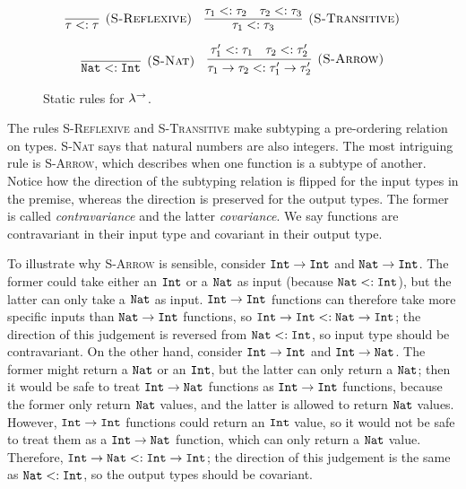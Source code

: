 \begin{figure}[h]

\fbox{$\tau <: \tau$}

	
\[
\begin{array}{c}

\infer[\textsc{(S-Reflexive)}]
	{\tau <: \tau}
	{}
	~~~
\infer[\textsc{(S-Transitive)}]
	{\tau_1 <: \tau_3}
	{\tau_1 <: \tau_2 & \tau_2 <: \tau_3}\\[2ex]

\infer[\textsc{(S-Nat)}]
	{\Nat <: \Int}
	{}~~~

\infer[\textsc{(S-Arrow)}]
	{\tau_1 \rightarrow \tau_2 <: \tau_1' \rightarrow \tau_2'}
	{\tau_1' <: \tau_1 & \tau_2 <: \tau_2'}


\end{array}
\]

\vspace{-12pt}
\caption{Static rules for $\lambda^{\rightarrow}$.}
\label{fig:stlc_static_rules}
\end{figure}

The rules \textsc{S-Reflexive} and \textsc{S-Transitive} make subtyping a pre-ordering relation on types. \textsc{S-Nat} says that natural numbers are also integers. The most intriguing rule is \textsc{S-Arrow}, which describes when one function is a subtype of another. Notice how the direction of the subtyping relation is flipped for the input types in the premise, whereas the direction is preserved for the output types. The former is called \textit{contravariance} and the latter \textit{covariance}. We say functions are contravariant in their input type and covariant in their output type.

To illustrate why \textsc{S-Arrow} is sensible, consider $\mathtt{Int} \rightarrow \mathtt{Int}$ and $\mathtt{Nat} \rightarrow \mathtt{Int}$. The former could take either an $\mathtt{Int}$ or a $\mathtt{Nat}$ as input (because $\mathtt{Nat} <: \mathtt{Int}$), but the latter can only take a $\mathtt{Nat}$ as input. $\mathtt{Int} \rightarrow \mathtt{Int}$ functions can therefore take more specific inputs than $\mathtt{Nat} \rightarrow \mathtt{Int}$ functions, so $\mathtt{Int} \rightarrow \mathtt{Int} <: \mathtt{Nat} \rightarrow \mathtt{Int}$; the direction of this judgement is reversed from $\mathtt{Nat} <: \mathtt{Int}$, so input type should be contravariant. On the other hand, consider $\mathtt{Int} \rightarrow \mathtt{Int}$ and $\mathtt{Int} \rightarrow \mathtt{Nat}$. The former might return a $\mathtt{Nat}$ or an $\mathtt{Int}$, but the latter can only return a $\mathtt{Nat}$; then it would be safe to treat $\mathtt{Int} \rightarrow \mathtt{Nat}$ functions as $\mathtt{Int} \rightarrow \mathtt{Int}$ functions, because the former only return $\mathtt{Nat}$ values, and the latter is allowed to return $\mathtt{Nat}$ values. However, $\mathtt{Int} \rightarrow \mathtt{Int}$ functions could return an $\mathtt{Int}$ value, so it would not be safe to treat them as a $\mathtt{Int} \rightarrow \mathtt{Nat}$ function, which can only return a $\mathtt{Nat}$ value. Therefore, $\mathtt{Int} \rightarrow \mathtt{Nat} <: \mathtt{Int} \rightarrow \mathtt{Int}$; the direction of this judgement is the same as $\mathtt{Nat} <: \mathtt{Int}$, so the output types should be covariant.


